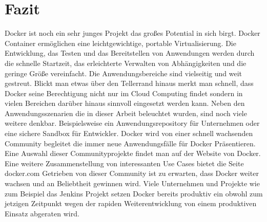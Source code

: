\chapter{Fazit}
\label{sec:fazit}
Docker ist noch ein sehr junges Projekt das großes Potential in sich birgt. 
Docker Container ermöglichen eine leichtgewichtige, portable Virtualisierung. Die Entwicklung, das Testen und das Bereitstellen von Anwendungen werden durch die schnelle Startzeit, das erleichterte Verwalten von Abhängigkeiten und die geringe Größe vereinfacht. Die Anwendungsbereiche sind vielseitig und weit gestreut. Blickt man etwas über den Tellerrand hinaus merkt man schnell, dass Docker seine Berechtigung nicht nur im Cloud Computing findet sondern in vielen Bereichen darüber hinaus sinnvoll eingesetzt werden kann.
Neben den Anwendungsszenarien die in dieser Arbeit beleuchtet wurden, sind noch viele weitere denkbar. Beispielsweise ein Anwendungsrepository für Unternehmen oder eine sichere Sandbox für Entwickler.
Docker wird von einer schnell wachsenden Community begleitet die immer neue Anwendungsfälle für Docker Präsentieren. Eine Auswahl dieser Communityprojekte findet man auf der Website von Docker. \cite{docker_docker_2014} Eine weitere Zusammenstellung von interessanten Use Cases bietet die Seite docker.com \cite{docker_use_2014}
Getrieben von dieser Community ist zu erwarten, dass Docker weiter wachsen und an Beliebtheit gewinnen wird.
Viele Unternehmen und Projekte wie zum Beispiel das Jenkins Projekt setzen Docker bereits produktiv ein obwohl zum jetzigen Zeitpunkt wegen der rapiden Weiterentwicklung von einem produktiven Einsatz abgeraten wird.